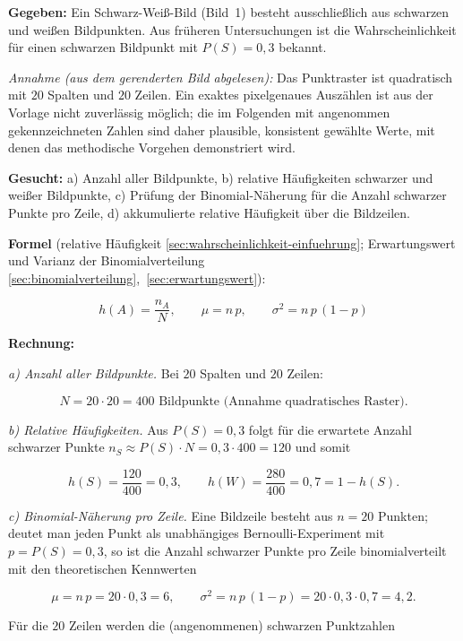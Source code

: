 \begin{beispiel}

\textbf{Gegeben:} Ein Schwarz-Weiß-Bild (Bild~1) besteht ausschließlich aus
schwarzen und weißen Bildpunkten. Aus früheren Untersuchungen ist die
Wahrscheinlichkeit für einen schwarzen Bildpunkt mit $P(S) = 0{,}3$ bekannt.

\emph{Annahme (aus dem gerenderten Bild abgelesen):} Das Punktraster ist
quadratisch mit $20$ Spalten und $20$ Zeilen. Ein exaktes pixelgenaues
Auszählen ist aus der Vorlage nicht zuverlässig möglich; die im Folgenden mit
\glqq{}angenommen\grqq{} gekennzeichneten Zahlen sind daher plausible,
konsistent gewählte Werte, mit denen das methodische Vorgehen demonstriert
wird.

\textbf{Gesucht:} a) Anzahl aller Bildpunkte, b) relative Häufigkeiten
schwarzer und weißer Bildpunkte, c) Prüfung der Binomial-Näherung für die
Anzahl schwarzer Punkte pro Zeile, d) akkumulierte relative Häufigkeit über die
Bildzeilen.

\textbf{Formel} (relative Häufigkeit \ref{sec:wahrscheinlichkeit-einfuehrung};
Erwartungswert und Varianz der Binomialverteilung
\ref{sec:binomialverteilung},~\ref{sec:erwartungswert}):

$$
h(A) = \frac{n_A}{N}, \qquad \mu = n\,p, \qquad \sigma^2 = n\,p\,(1-p)
$$

\textbf{Rechnung:}

\emph{a) Anzahl aller Bildpunkte.} Bei $20$ Spalten und $20$ Zeilen:

$$
N = 20 \cdot 20 = 400 \text{ Bildpunkte (Annahme quadratisches Raster).}
$$

\emph{b) Relative Häufigkeiten.} Aus $P(S) = 0{,}3$ folgt für die erwartete
Anzahl schwarzer Punkte $n_S \approx P(S)\cdot N = 0{,}3 \cdot 400 = 120$ und
somit

$$
h(S) = \frac{120}{400} = 0{,}3, \qquad
h(W) = \frac{280}{400} = 0{,}7 = 1 - h(S).
$$

\emph{c) Binomial-Näherung pro Zeile.} Eine Bildzeile besteht aus $n = 20$
Punkten; deutet man jeden Punkt als unabhängiges Bernoulli-Experiment mit
$p = P(S) = 0{,}3$, so ist die Anzahl schwarzer Punkte pro Zeile
binomialverteilt mit den theoretischen Kennwerten

$$
\mu = n\,p = 20 \cdot 0{,}3 = 6, \qquad
\sigma^2 = n\,p\,(1-p) = 20 \cdot 0{,}3 \cdot 0{,}7 = 4{,}2 .
$$

Für die $20$ Zeilen werden die (angenommenen) schwarzen Punktzahlen


\end{beispiel}

